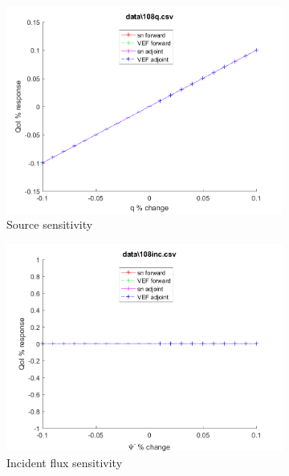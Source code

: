 \documentclass{article}
\begin{document}
\begin{figure}[H]
\label{Case108Sens}
\centering
\begin{subfigure}{.5\textwidth}
  \centering
  \includegraphics[width=.98\linewidth]{IanProposal/figures2/108qSens.png}
  \caption{Source sensitivity}
  \label{fig:sfig1}
\end{subfigure}%
\begin{subfigure}{.5\textwidth}
  \centering
  \includegraphics[width=.98\linewidth]{IanProposal/figures2/108incSens.png}
  \caption{Incident flux sensitivity}
  \label{fig:sfig4}
\end{subfigure}%
\\
\begin{subfigure}{.5\textwidth}
  \centering

\end{subfigure}
\end{figure}
\end{document}
